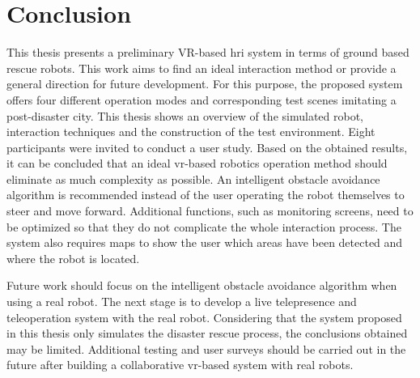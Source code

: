 \chapter{Conclusion}
\label{conclusion}

This thesis presents a preliminary VR-based \gls{hri} system in terms of ground based rescue robots. This work aims to find an ideal interaction method or provide a general direction for future development. For this purpose, the proposed system offers four different operation modes and corresponding test scenes imitating a post-disaster city. This thesis shows an overview of the simulated robot, interaction techniques and the construction of the test environment. Eight participants were invited to conduct a user study. Based on the obtained results, it can be concluded that an ideal \gls{vr}-based robotics operation method should eliminate as much complexity as possible. An intelligent obstacle avoidance algorithm is recommended instead of the user operating the robot themselves to steer and move forward. Additional functions, such as monitoring screens, need to be optimized so that they do not complicate the whole interaction process. The system also requires maps to show the user which areas have been detected and where the robot is located.

Future work should focus on the intelligent obstacle avoidance algorithm when using a real robot. The next stage is to develop a live telepresence and teleoperation system with the real robot. Considering that the system proposed in this thesis only simulates the disaster rescue process, the conclusions obtained may be limited. Additional testing and user surveys should be carried out in the future after building a collaborative \gls{vr}-based system with real robots.
